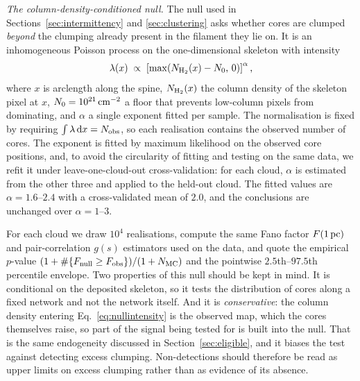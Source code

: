 \documentclass[usenatbib,twoside,twocolumn]{mnras}
\begin{document}
\emph{The column-density-conditioned null.} The null used in Sections~\ref{sec:intermittency} and \ref{sec:clustering} asks whether cores are clumped \emph{beyond} the clumping already present in the filament they lie on. It is an inhomogeneous Poisson process on the one-dimensional skeleton with intensity
\begin{equation}
\lambda(x)\;\propto\;\left[\max\!\left(N_{\rm H_2}(x)-N_0,\,0\right)\right]^{\alpha},
\label{eq:nullintensity}
\end{equation}
where $x$ is arclength along the spine, $N_{\rm H_2}(x)$ the column density of the skeleton pixel at $x$, $N_0=10^{21}\,{\rm cm^{-2}}$ a floor that prevents low-column pixels from dominating, and $\alpha$ a single exponent fitted per sample. The normalisation is fixed by requiring $\int\lambda\,{\rm d}x=N_{\rm obs}$, so each realisation contains the observed number of cores. The exponent is fitted by maximum likelihood on the observed core positions, and, to avoid the circularity of fitting and testing on the same data, we refit it under leave-one-cloud-out cross-validation: for each cloud, $\alpha$ is estimated from the other three and applied to the held-out cloud. The fitted values are $\alpha=1.6$--$2.4$ with a cross-validated mean of $2.0$, and the conclusions are unchanged over $\alpha=1$--$3$.

For each cloud we draw $10^4$ realisations, compute the same Fano factor $F(1\,{\rm pc})$ and pair-correlation $g(s)$ estimators used on the data, and quote the empirical $p$-value $(1+\#\{F_{\rm null}\geq F_{\rm obs}\})/(1+N_{\rm MC})$ and the pointwise $2.5$th--$97.5$th percentile envelope. Two properties of this null should be kept in mind. It is conditional on the deposited skeleton, so it tests the distribution of cores along a fixed network and not the network itself. And it is \emph{conservative}: the column density entering Eq.~\ref{eq:nullintensity} is the observed map, which the cores themselves raise, so part of the signal being tested for is built into the null. That is the same endogeneity discussed in Section~\ref{sec:eligible}, and it biases the test against detecting excess clumping. Non-detections should therefore be read as upper limits on excess clumping rather than as evidence of its absence.
\end{document}
